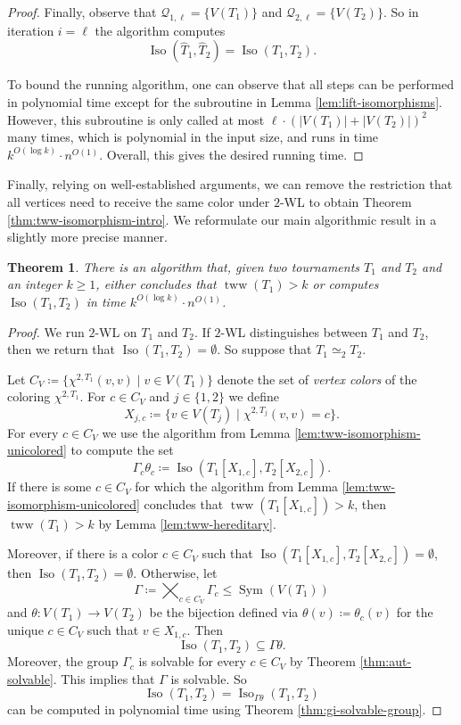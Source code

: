 \PassOptionsToPackage{dvipsnames,svgnames}{xcolor}\documentclass[10pt,a4paper]{article}
\newtheorem{theorem}{Theorem}[section]
\newcommand{\CQ}{{\mathcal Q}}
\newcommand{\WL}[2]{\chi^{#1,#2}}
\DeclareMathOperator{\Iso}{Iso}
\DeclareMathOperator{\Sym}{Sym}
\DeclareMathOperator{\tww}{tww}
\begin{document}
\begin{proof}
 Finally, observe that $\CQ_{1,\ell} = \{V(T_1)\}$ and $\CQ_{2,\ell} = \{V(T_2)\}$.
 So in iteration $i = \ell$ the algorithm computes
 \[\Iso(\widehat{T}_1,\widehat{T}_2) = \Iso(T_1,T_2).\]

 To bound the running algorithm, one can observe that all steps can be performed in polynomial time except for the subroutine in Lemma \ref{lem:lift-isomorphisms}.
 However, this subroutine is only called at most $\ell \cdot (|V(T_1)| + |V(T_2)|)^2$ many times, which is polynomial in the input size, and runs in time $k^{O(\log k)} \cdot n^{O(1)}$.
 Overall, this gives the desired running time.
\end{proof}

Finally, relying on well-established arguments, we can remove the restriction that all vertices need to receive the same color under $2$-WL to obtain Theorem \ref{thm:tww-isomorphism-intro}.
We reformulate our main algorithmic result in a slightly more precise manner.

\begin{theorem}
 \label{thm:tww-isomorphism}
 There is an algorithm that, given two tournaments $T_1$ and $T_2$ and an integer $k \geq 1$, either concludes that $\tww(T_1) > k$ or computes $\Iso(T_1,T_2)$ in time $k^{O(\log k)} \cdot n^{O(1)}$.
\end{theorem}

\begin{proof}
 We run $2$-WL on $T_1$ and $T_2$.
 If $2$-WL distinguishes between $T_1$ and $T_2$, then we return that $\Iso(T_1,T_2) = \emptyset$.
 So suppose that $T_1 \simeq_2 T_2$.

 Let $C_V \coloneqq \{\WL{2}{T_1}(v,v) \mid v \in V(T_1)\}$ denote the set of \emph{vertex colors} of the coloring $\WL{2}{T_1}$.
 For $c \in C_V$ and $j \in \{1,2\}$ we define
 \[X_{j,c} \coloneqq \{v \in V(T_j) \mid \WL{2}{T_j}(v,v) = c\}.\]
 For every $c \in C_V$ we use the algorithm from Lemma \ref{lem:tww-isomorphism-unicolored} to compute the set
 \[\Gamma_c\theta_c \coloneqq \Iso(T_1[X_{1,c}],T_2[X_{2,c}]).\]
 If there is some $c \in C_V$ for which the algorithm from Lemma \ref{lem:tww-isomorphism-unicolored} concludes that $\tww(T_1[X_{1,c}]) > k$, then $\tww(T_1) > k$ by Lemma \ref{lem:tww-hereditary}.

 Moreover, if there is a color $c \in C_V$ such that $\Iso(T_1[X_{1,c}],T_2[X_{2,c}]) = \emptyset$, then $\Iso(T_1,T_2) = \emptyset$.
 Otherwise, let
 \[\Gamma \coloneqq \bigtimes_{c \in C_V} \Gamma_c \leq \Sym(V(T_1))\]
 and $\theta\colon V(T_1) \to V(T_2)$ be the bijection defined via $\theta(v) \coloneqq \theta_c(v)$ for the unique $c \in C_V$ such that $v \in X_{1,c}$.
 Then
 \[\Iso(T_1,T_2) \subseteq \Gamma\theta.\]
 Moreover, the group $\Gamma_c$ is solvable for every $c \in C_V$ by Theorem \ref{thm:aut-solvable}.
 This implies that $\Gamma$ is solvable.
 So
 \[\Iso(T_1,T_2) = \Iso_{\Gamma\theta}(T_1,T_2)\]
 can be computed in polynomial time using Theorem \ref{thm:gi-solvable-group}.
\end{proof}
\end{document}
